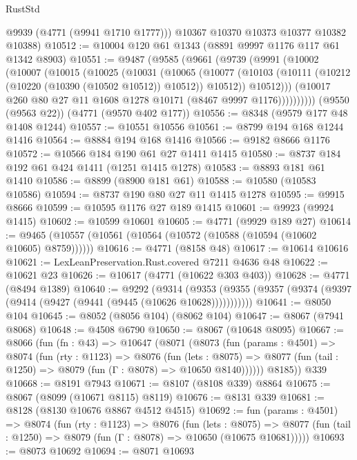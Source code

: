 \begin{lexlean}{RustStd}
\begin{coremodule}
        @9939
        (@4771 (@9941 @1710 @1777)))
      @10367
      @10370
      @10373
      @10377
      @10382
      @10388)
@10512 := @10004 @120 @61 @1343 (@8891 @9997 @1176 @117 @61 @1342 @8903)
@10551 := @9487
    (@9585
      (@9661
        (@9739
          (@9991
            (@10002
              (@10007
                (@10015
                  (@10025
                    (@10031
                      (@10065
                        (@10077
                          (@10103 (@10111 (@10212 (@10220 (@10390 (@10502 @10512)) @10512)) @10512))
                          @10512)))
                    (@10017 @260 @80 @27 @11 @1608 @1278 @10171 (@8467 @9997 @1176))))))))))
    (@9550 (@9563 @22))
    (@4771 (@9570 @402 @177))
@10556 := @8348 (@9579 @177 @48 @1408 @1244)
@10557 := @10551 @10556
@10561 := @8799 @194 @168 @1244 @1416
@10564 := @8884 @194 @168 @1416
@10566 := @9182 @8666 @1176
@10572 := @10566 @184 @190 @61 @27 @1411 @1415
@10580 := @8737 @184 @192 @61 @424 @1411 (@1251 @1415 @1278)
@10583 := @8893 @181 @61 @1410
@10586 := @8899 (@8900 @181 @61)
@10588 := @10580 (@10583 @10586)
@10594 := @8737 @190 @80 @27 @11 @1415 @1278
@10595 := @9915 @8666
@10599 := @10595 @1176 @27 @189 @1415
@10601 := @9923 (@9924 @1415)
@10602 := @10599 @10601
@10605 := @4771 (@9929 @189 @27)
@10614 := @9465 (@10557 (@10561 (@10564 (@10572 (@10588 (@10594 (@10602 @10605) @8759))))))
@10616 := @4771 (@8158 @48)
@10617 := @10614 @10616
@10621 := LexLeanPreservation.Rust.covered @7211 @4636 @48
@10622 := @10621 @23
@10626 := @10617 (@4771 (@10622 @303 @403))
@10628 := @4771 (@8494 @1389)
@10640 := @9292
    (@9314 (@9353 (@9355 (@9357 (@9374 (@9397 (@9414 (@9427 (@9441 (@9445 (@10626 @10628)))))))))))
@10641 := @8050 @104
@10645 := @8052 (@8056 @104) (@8062 @104)
@10647 := @8067 (@7941 @8068)
@10648 := @4508 @6790
@10650 := @8067 (@10648 @8095)
@10667 := @8066
    (fun (fn : @43) =>
    @10647
      (@8071
        (@8073
          (fun (params : @4501) =>
          @8074
            (fun (rty : @1123) =>
            @8076
              (fun (lets : @8075) =>
              @8077 (fun (tail : @1250) => @8079 (fun (Γ : @8078) => @10650 @8140))))))
        @8185))
    @339
@10668 := @8191 @7943
@10671 := @8107 (@8108 @339) @8864
@10675 := @8067 (@8099 (@10671 @8115) @8119)
@10676 := @8131 @339
@10681 := @8128 (@8130 @10676 @8867 @4512 @4515)
@10692 := fun (params : @4501) =>
  @8074
    (fun (rty : @1123) =>
    @8076
      (fun (lets : @8075) =>
      @8077 (fun (tail : @1250) => @8079 (fun (Γ : @8078) => @10650 (@10675 @10681)))))
@10693 := @8073 @10692
@10694 := @8071 @10693

\end{coremodule}
\end{lexlean}
